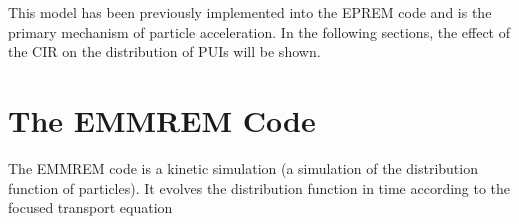 \documentclass[%
 reprint,
 amsmath,amssymb,
 aps,
]{revtex4-1}
\begin{document}
This model has been previously implemented into the EPREM code and is the primary mechanism of particle acceleration. In the following sections, the effect of the CIR on the distribution of PUIs will be shown.



\section{The EMMREM Code}




The EMMREM code \cite{EPREM} is a kinetic simulation (a simulation of the distribution function of particles). It evolves the distribution function in time according to the focused transport equation \cite{chen}
\end{document}
